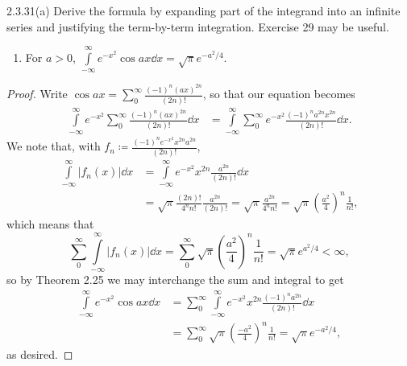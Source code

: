 \documentclass[11pt]{article}
\begin{document}
\begin{problem}{2.3.31(a)}
	Derive the formula by expanding part of the integrand into an infinite series and justifying the term-by-term integration. Exercise 29 may be useful.
	\begin{enumerate}[label=(\alph*)]
		\item For \( a>0 \), \( \int\limits_{-\infty}^{\infty} e^{-x^2}\cos ax\dd{x} = \sqrt{\pi} e^{-a^2/4} \).
	\end{enumerate}
	\begin{proof}
		Write \( \cos ax = \sum\limits_0^{\infty} \frac{(-1)^{n}(ax)^{2n}}{(2n)!} \), so that our equation becomes
		\begin{equation}
			\label{eq:17}
			\begin{aligned}
				\int\limits_{-\infty}^{\infty} e^{-x^2} \sum\limits_0^{\infty} \frac{(-1)^n(ax)^{2n}}{(2n)!} \dd{x} & = \int\limits_{-\infty}^{\infty} \sum\limits_0^{\infty} e^{-x^2} \frac{(-1)^na^{2n}x^{2n}}{(2n)!} \dd{x}.
			\end{aligned}
		\end{equation}
		We note that, with \( f_n \coloneq \frac{(-1)^ne^{-x^2}x^{2n}a^{2n}}{(2n)!}\),
		\begin{equation}
			\label{eq:18}
			\begin{aligned}
				\int\limits_{-\infty}^{\infty} |f_n(x)|\dd{x} & = \int\limits_{-\infty}^{\infty} e^{-x^2}x^{2n} \frac{a^{2n}}{(2n)!} \dd{x}                                                                         \\
				                                              & = \sqrt{\pi} \frac{(2n)!}{4^nn!} \frac{a^{2n}}{(2n)!} = \sqrt{\pi} \frac{a^{2n}}{4^{n}n!} = \sqrt{\pi} \left( \frac{a^2}{4} \right)^n \frac{1}{n!},
			\end{aligned}
		\end{equation}
		which means that
		\begin{equation}
			\label{eq:19}
			\sum\limits_0^{\infty} \int\limits_{-\infty}^{\infty} |f_n(x)|\dd{x} = \sum\limits_0^{\infty} \sqrt{\pi} \left( \frac{a^2}{4} \right)^{n} \frac{1}{n!} = \sqrt{\pi}e^{a^2/4} < \infty,
		\end{equation}
		so by Theorem 2.25 we may interchange the sum and integral to get
		\begin{equation}
			\label{eq:20}
			\begin{aligned}
				\int\limits_{-\infty}^{\infty} e^{-x^2}\cos ax \dd{x} & = \sum\limits_0^{\infty} \int\limits_{-\infty}^{\infty} e^{-x^2}x^{2n} \frac{(-1)^na^{2n}}{(2n)!} \dd{x}  \\
				                                                      & = \sum\limits_0^{\infty} \sqrt{\pi} \left( \frac{-a^2}{4} \right)^n  \frac{1}{n!} = \sqrt{\pi}e^{-a^2/4},
			\end{aligned}
		\end{equation}
		as desired.
	\end{proof}
\end{problem}
\end{document}
